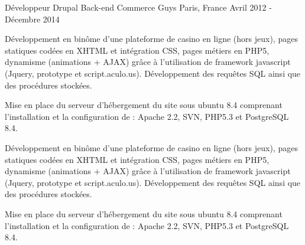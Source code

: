 \cventry
{Développeur Drupal Back-end} %
{Commerce Guys} %
{Paris, France} %
{Avril 2012 - Décembre 2014} %
{
\begin{cvsubentries}
    {
    \begin{cvitems} %
        \item
        {
        Développement en binôme d’une plateforme de casino en ligne (hors jeux),
        pages statiques codées en XHTML et intégration CSS, pages métiers en PHP5, dynamisme
        (animations + AJAX) grâce à l’utilisation de framework javascript (Jquery, prototype et script.aculo.us).
        Développement des requêtes SQL ainsi que des procédures stockées.
        }
        \item
        {
        Mise en place du serveur d'hébergement du site sous ubuntu 8.4 comprenant l'installation et la
        configuration de : Apache 2.2, SVN, PHP5.3 et PostgreSQL 8.4.
        }
    \end{cvitems}
    }
    {
    \begin{cvitems} %
        \item
        {
        Développement en binôme d’une plateforme de casino en ligne (hors jeux),
        pages statiques codées en XHTML et intégration CSS, pages métiers en PHP5, dynamisme
        (animations + AJAX) grâce à l’utilisation de framework javascript (Jquery, prototype et script.aculo.us).
        Développement des requêtes SQL ainsi que des procédures stockées.
        }
        \item
        {
        Mise en place du serveur d'hébergement du site sous ubuntu 8.4 comprenant l'installation et la
        configuration de : Apache 2.2, SVN, PHP5.3 et PostgreSQL 8.4.
        }
    \end{cvitems}
    }
\end{cvsubentries}
}